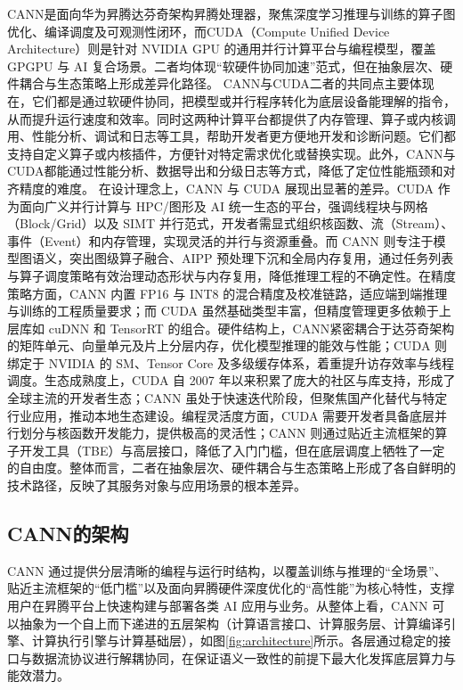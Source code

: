 CANN是面向华为昇腾达芬奇架构昇腾处理器，聚焦深度学习推理与训练的算子图优化、编译调度及可观测性闭环，而CUDA（Compute
Unified Device Architecture）则是针对 NVIDIA GPU
的通用并行计算平台与编程模型，覆盖 GPGPU 与 AI
复合场景。二者均体现``软硬件协同加速''范式，但在抽象层次、硬件耦合与生态策略上形成差异化路径。
CANN与CUDA二者的共同点主要体现在，它们都是通过软硬件协同，把模型或并行程序转化为底层设备能理解的指令，从而提升运行速度和效率。同时这两种计算平台都提供了内存管理、算子或内核调用、性能分析、调试和日志等工具，帮助开发者更方便地开发和诊断问题。它们都支持自定义算子或内核插件，方便针对特定需求优化或替换实现。此外，CANN与CUDA都能通过性能分析、数据导出和分级日志等方式，降低了定位性能瓶颈和对齐精度的难度。
在设计理念上，CANN 与 CUDA 展现出显著的差异。CUDA 作为面向广义并行计算与
HPC/图形及 AI 统一生态的平台，强调线程块与网格（Block/Grid）以及 SIMT
并行范式，开发者需显式组织核函数、流（Stream）、事件（Event）和内存管理，实现灵活的并行与资源重叠。而
CANN 则专注于模型图语义，突出图级算子融合、AIPP
预处理下沉和全局内存复用，通过任务列表与算子调度策略有效治理动态形状与内存复用，降低推理工程的不确定性。在精度策略方面，CANN
内置 FP16 与 INT8
的混合精度及校准链路，适应端到端推理与训练的工程质量要求；而 CUDA
虽然基础类型丰富，但精度管理更多依赖于上层库如 cuDNN 和 TensorRT
的组合。硬件结构上，CANN紧密耦合于达芬奇架构的矩阵单元、向量单元及片上分层内存，优化模型推理的能效与性能；CUDA
则绑定于 NVIDIA 的 SM、Tensor Core
及多级缓存体系，着重提升访存效率与线程调度。生态成熟度上，CUDA 自 2007
年以来积累了庞大的社区与库支持，形成了全球主流的开发者生态；CANN
虽处于快速迭代阶段，但聚焦国产化替代与特定行业应用，推动本地生态建设。编程灵活度方面，CUDA
需要开发者具备底层并行划分与核函数开发能力，提供极高的灵活性；CANN
则通过贴近主流框架的算子开发工具（TBE）与高层接口，降低了入门门槛，但在底层调度上牺牲了一定的自由度。整体而言，二者在抽象层次、硬件耦合与生态策略上形成了各自鲜明的技术路径，反映了其服务对象与应用场景的根本差异。

\subsection{CANN的架构}\label{src-book-chapter2-h4}

CANN
通过提供分层清晰的编程与运行时结构，以覆盖训练与推理的``全场景''、贴近主流框架的``低门槛''以及面向昇腾硬件深度优化的``高性能''为核心特性，支撑用户在昇腾平台上快速构建与部署各类
AI 应用与业务。从整体上看，CANN
可以抽象为一个自上而下递进的五层架构（计算语言接口、计算服务层、计算编译引擎、计算执行引擎与计算基础层），如图\ref{fig:architecture}所示。各层通过稳定的接口与数据流协议进行解耦协同，在保证语义一致性的前提下最大化发挥底层算力与能效潜力。

